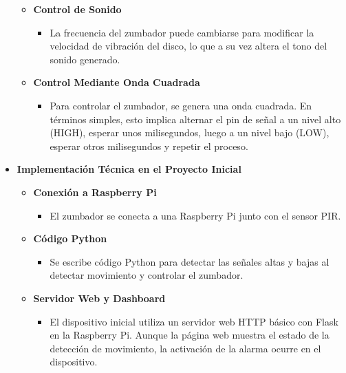 \documentclass{report}
\begin{document}
\begin{itemize}
\begin{itemize}
        \item \textbf{Control de Sonido}
        \begin{itemize}
            \item La frecuencia del zumbador puede cambiarse para modificar la velocidad de vibración del disco, lo que a su vez altera el tono del sonido 
            generado.
        \end{itemize}

        \item \textbf{Control Mediante Onda Cuadrada}
        \begin{itemize}
            \item Para controlar el zumbador, se genera una onda cuadrada. En términos simples, esto implica alternar el pin de señal a un nivel alto (HIGH), 
            esperar unos milisegundos, luego a un nivel bajo (LOW), esperar otros milisegundos y repetir el proceso.
        \end{itemize}
    \end{itemize}

    \item \textbf{Implementación Técnica en el Proyecto Inicial}
    \begin{itemize}
        \item \textbf{Conexión a Raspberry Pi}
        \begin{itemize}
            \item El zumbador se conecta a una Raspberry Pi junto con el sensor PIR.
        \end{itemize}

        \item \textbf{Código Python}
        \begin{itemize}
            \item Se escribe código Python para detectar las señales altas y bajas al detectar movimiento y controlar el zumbador.
        \end{itemize}

        \item \textbf{Servidor Web y Dashboard}
        \begin{itemize}
            \item  El dispositivo inicial utiliza un servidor web HTTP básico con Flask en la Raspberry Pi. Aunque la página web muestra el estado 
            de la detección de movimiento, la activación de la alarma ocurre en el dispositivo.
        \end{itemize}


\end{itemize}
\end{itemize}
\end{document}
